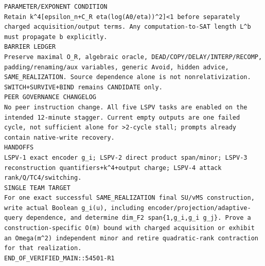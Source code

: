 \documentclass[11pt]{article}
\begin{document}
\begin{Verbatim}[breaklines=true,breakanywhere=true]
PARAMETER/EXPONENT CONDITION
Retain k^4[epsilon_n+C_R eta(log(A0/eta))^2]<1 before separately charged acquisition/output terms. Any computation-to-SAT length L^b must propagate b explicitly.
BARRIER LEDGER
Preserve maximal O_R, algebraic oracle, DEAD/COPY/DELAY/INTERP/RECOMP, padding/renaming/aux variables, generic Avoid, hidden advice, SAME_REALIZATION. Source dependence alone is not nonrelativization. SWITCH+SURVIVE+BIND remains CANDIDATE only.
PEER GOVERNANCE CHANGELOG
No peer instruction change. All five LSPV tasks are enabled on the intended 12-minute stagger. Current empty outputs are one failed cycle, not sufficient alone for >2-cycle stall; prompts already contain native-write recovery.
HANDOFFS
LSPV-1 exact encoder g_i; LSPV-2 direct product span/minor; LSPV-3 reconstruction quantifiers+k^4+output charge; LSPV-4 attack rank/Q/TC4/switching.
SINGLE TEAM TARGET
For one exact successful SAME_REALIZATION final SU/vMS construction, write actual Boolean g_i(u), including encoder/projection/adaptive-query dependence, and determine dim_F2 span{1,g_i,g_i g_j}. Prove a construction-specific O(m) bound with charged acquisition or exhibit an Omega(m^2) independent minor and retire quadratic-rank contraction for that realization.
END_OF_VERIFIED_MAIN::54501-R1
\end{Verbatim}
\end{document}
